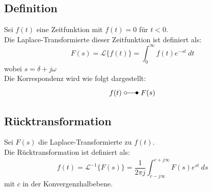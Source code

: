 \documentclass[10pt,a4paper]{article}
\begin{document}
\subsection{Definition}
Sei $f(t)$ eine Zeitfunktion mit $f(t) = 0$ für $t < 0$. \\
Die Laplace-Transformierte dieser Zeitfunktion ist definiert als:
$$
	F(s) = \mathcal{L}\{f(t)\} = \int_0^{∞} f(t) e^{-st} ~dt
$$
wobei
$s = \delta + j \omega$ \\

Die Korrespondenz wird wie folgt dargestellt:
$$
	f(t) ~\laplace ~F(s)
$$

\subsection{Rücktransformation}
Sei $F(s)$ die Laplace-Transformierte zu $f(t)$. \\
Die Rücktransformation ist definiert als:
$$
	f(t) = \mathcal{L}^{-1}\{F(s)\} = \frac 1 {2\pi j} \int_{c - j ∞}^{c + j∞} F(s) e^{st} ~ds
$$
mit $c$ in der Konvergenzhalbebene.
\end{document}
